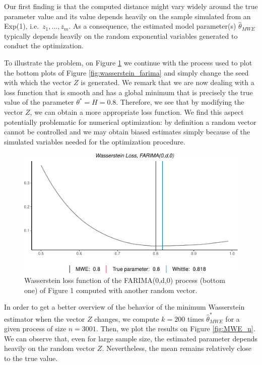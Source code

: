\documentclass[
  11pt,
]{article}
\begin{document}
Our first finding is that the computed distance might vary widely around
the true parameter value and its value depends heavily on the sample
simulated from an Exp(1), i.e.~\(z_1, ..., z_m\). As a consequence, the
estimated model parameter(s) \(\hat \theta_{MWE}\) typically depends
heavily on the random exponential variables generated to conduct the
optimization.

To illustrate the problem, on Figure \ref{fig:wasserstein_z} we continue
with the process used to plot the bottom plots of Figure
\ref{fig:wasserstein_farima} and simply change the seed with which the
vector \(Z\) is generated. We remark that we are now dealing with a loss
function that is smooth and has a global minimum that is precisely the
true value of the parameter \(\theta^* = H = 0.8\). Therefore, we see
that by modifying the vector \(Z\), we can obtain a more appropriate
loss function. We find this aspect potentially problematic for numerical
optimization: by definition a random vector cannot be controlled and we
may obtain biased estimates simply because of the simulated variables
needed for the optimization procedure.

\begin{figure}[h]

{\centering \includegraphics[width=0.55\linewidth]{Master_thesis_V4_files/figure-latex/wasserstein_z-1} 

}

\caption{Wasserstein loss function of the FARIMA(0,d,0) process (bottom one) of Figure 1 computed with another random vector.}\label{fig:wasserstein_z}
\end{figure}

In order to get a better overview of the behavior of the minimum
Wasserstein estimator when the vector \(Z\) changes, we compute
\(k = 200\) times \(\hat \theta^*_{MWE}\) for a given process of size
\(n = 3001\). Then, we plot the results on Figure \ref{fig:MWE_n}. We
can observe that, even for large sample size, the estimated parameter
depends heavily on the random vector \(Z\). Nevertheless, the mean
remains relatively close to the true value.
\end{document}

